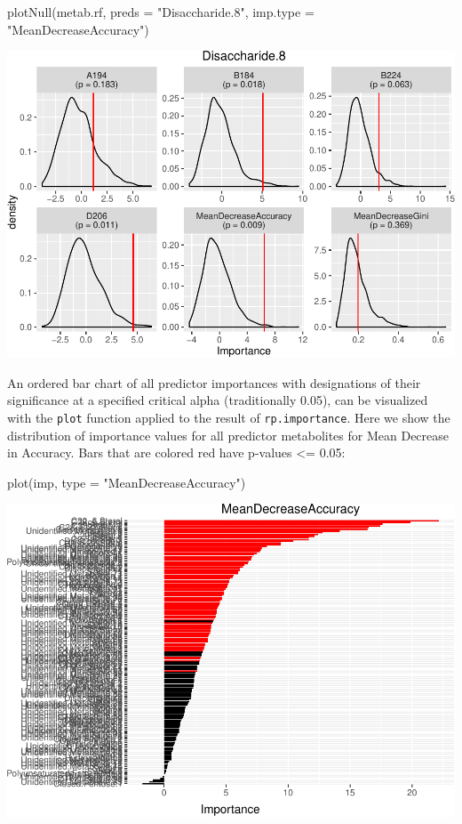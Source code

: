 \begin{Schunk}
\begin{Sinput}
plotNull(metab.rf, preds = "Disaccharide.8", imp.type = "MeanDecreaseAccuracy")
\end{Sinput}

\includegraphics{archer_files/figure-latex/plotNull-1} \end{Schunk}

An ordered bar chart of all predictor importances with designations of
their significance at a specified critical alpha (traditionally 0.05),
can be visualized with the \texttt{plot} function applied to the result
of \texttt{rp.importance}. Here we show the distribution of importance
values for all predictor metabolites for Mean Decrease in Accuracy. Bars
that are colored red have p-values \textless{}= 0.05:

\begin{Schunk}
\begin{Sinput}
plot(imp, type = "MeanDecreaseAccuracy")
\end{Sinput}

\includegraphics{archer_files/figure-latex/plot_imp1-1} \end{Schunk}

